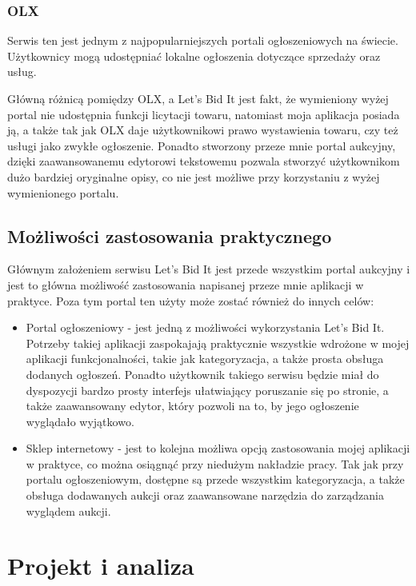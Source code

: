 \documentclass[brudnopis]{xmgr}
\begin{document}
\subsection{OLX}  

Serwis ten jest jednym z najpopularniejszych portali ogłoszeniowych na świecie. Użytkownicy
mogą udostępniać lokalne ogłoszenia dotyczące sprzedaży oraz usług.

Główną różnicą pomiędzy OLX, a Let's Bid It jest fakt,
że wymieniony wyżej portal nie udostępnia funkcji licytacji towaru, natomiast moja aplikacja posiada ją, a także tak jak OLX daje użytkownikowi prawo wystawienia towaru, czy też usługi jako zwykłe ogłoszenie. Ponadto stworzony przeze mnie portal aukcyjny, dzięki zaawansowanemu edytorowi tekstowemu pozwala stworzyć użytkownikom dużo bardziej oryginalne opisy, co nie jest możliwe przy korzystaniu z wyżej wymienionego portalu.

\section{Możliwości zastosowania praktycznego}
Głównym założeniem serwisu Let's Bid It jest przede wszystkim portal aukcyjny i jest to główna możliwość zastosowania napisanej przeze mnie aplikacji w praktyce. Poza tym portal ten użyty może zostać również do innych celów:

\begin{itemize}

\item Portal ogłoszeniowy - jest jedną z możliwości wykorzystania Let's Bid It. Potrzeby takiej aplikacji zaspokajają praktycznie wszystkie wdrożone w mojej aplikacji funkcjonalności, takie jak kategoryzacja, a także prosta obsługa dodanych ogłoszeń. Ponadto użytkownik takiego  serwisu będzie miał do dyspozycji bardzo prosty interfejs ułatwiający poruszanie się po stronie, a także zaawansowany edytor, który pozwoli na to, by jego ogłoszenie wyglądało wyjątkowo.

\item Sklep internetowy - jest to kolejna możliwa opcją zastosowania mojej aplikacji w praktyce, co można osiągnąć przy niedużym nakładzie pracy. Tak jak przy portalu ogłoszeniowym, dostępne są przede wszystkim kategoryzacja, a także obsługa dodawanych aukcji oraz zaawansowane narzędzia do zarządzania wyglądem aukcji.

\end{itemize}

\chapter{Projekt i analiza}
\end{document}
